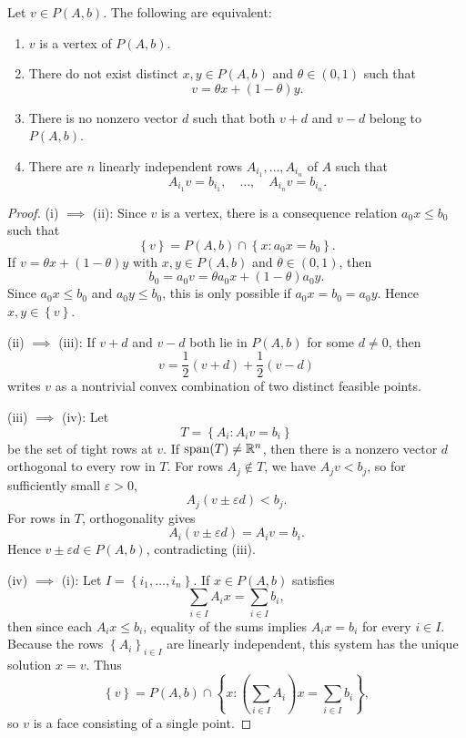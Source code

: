 \begin{proposition}
	Let $v \in P(A,b)$. The following are equivalent:
	\begin{enumerate}[label = (\roman*)]
		\item $v$ is a vertex of $P(A,b)$.
		\item There do not exist distinct $x,y \in P(A,b)$ and $\theta \in (0,1)$ such that
		\[
			v = \theta x + (1-\theta)y
		.\]
		\item There is no nonzero vector $d$ such that both $v+d$ and $v-d$ belong to $P(A,b)$.
		\item There are $n$ linearly independent rows $A_{i_1},\ldots,A_{i_n}$ of $A$ such that
		\[
			A_{i_1}v = b_{i_1}, \quad \ldots, \quad A_{i_n}v = b_{i_n}
		.\]
	\end{enumerate}
\end{proposition}
\begin{proof}
	(i) $\implies$ (ii): Since $v$ is a vertex, there is a consequence relation $a_0 x \le b_0$ such that
	\[
		\left\{v\right\} = P(A,b) \cap \left\{x : a_0 x = b_0\right\}
	.\]
	If $v = \theta x + (1-\theta)y$ with $x,y \in P(A,b)$ and $\theta \in (0,1)$, then
	\[
		b_0 = a_0 v = \theta a_0 x + (1-\theta)a_0 y
	.\]
	Since $a_0 x \le b_0$ and $a_0 y \le b_0$, this is only possible if $a_0 x = b_0 = a_0 y$. Hence $x,y \in \left\{v\right\}$.

	(ii) $\implies$ (iii): If $v+d$ and $v-d$ both lie in $P(A,b)$ for some $d \ne 0$, then
	\[
		v = \frac{1}{2}(v+d) + \frac{1}{2}(v-d)
	\]
	writes $v$ as a nontrivial convex combination of two distinct feasible points.

	(iii) $\implies$ (iv): Let
	\[
		T = \left\{A_i : A_i v = b_i\right\}
	\]
	be the set of tight rows at $v$. If $\operatorname{span}(T) \ne \mathbb{R}^n$, then there is a nonzero vector $d$ orthogonal to every row in $T$. For rows $A_j \notin T$, we have $A_j v < b_j$, so for sufficiently small $\varepsilon > 0$,
	\[
		A_j(v \pm \varepsilon d) < b_j
	.\]
	For rows in $T$, orthogonality gives
	\[
		A_i(v \pm \varepsilon d) = A_i v = b_i
	.\]
	Hence $v \pm \varepsilon d \in P(A,b)$, contradicting (iii).

	(iv) $\implies$ (i): Let $I = \left\{i_1,\ldots,i_n\right\}$. If $x \in P(A,b)$ satisfies
	\[
		\sum_{i \in I} A_i x = \sum_{i \in I} b_i
	,\]
	then since each $A_i x \le b_i$, equality of the sums implies $A_i x = b_i$ for every $i \in I$. Because the rows $\left\{A_i\right\}_{i \in I}$ are linearly independent, this system has the unique solution $x = v$. Thus
	\[
		\left\{v\right\} = P(A,b) \cap \left\{x : \left(\sum_{i \in I} A_i\right)x = \sum_{i \in I} b_i\right\}
	,\]
	so $v$ is a face consisting of a single point.
\end{proof}

